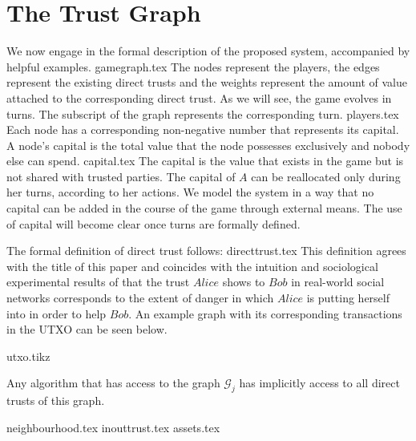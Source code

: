 \section{The Trust Graph}
  We now engage in the formal description of the proposed system, accompanied by helpful examples.
  {gamegraph.tex}
  \noindent The nodes represent the players, the edges represent the existing direct trusts and the weights represent the
  amount of value attached to the corresponding direct trust. As we will see, the game evolves in turns. The subscript of the
  graph represents the corresponding turn.
  {players.tex}
  \noindent Each node has a corresponding non-negative number that represents its capital. A node's capital is the total value
  that the node possesses exclusively and nobody else can spend.
  {capital.tex}
  \noindent The capital is the value that exists in the game but is not shared with trusted parties. The capital of $A$ can be
  reallocated only during her turns, according to her actions. We model the system in a way that no capital can be added in
  the course of the game through external means. The use of capital will become clear once turns are formally defined.

  The formal definition of direct trust follows:
  {directtrust.tex}
  \noindent This definition agrees with the title of this paper and coincides with the intuition and sociological experimental
  results of \cite{kmrs} that the trust $Alice$ shows to $Bob$ in real-world social networks corresponds to the extent of
  danger in which $Alice$ is putting herself into in order to help $Bob$. An example graph with its corresponding transactions
  in the UTXO can be seen below.

  {utxo.tikz}

  \noindent Any algorithm that has access to the graph $\mathcal{G}_j$ has implicitly access to all direct trusts of this
  graph.

  {neighbourhood.tex}
  {inouttrust.tex}
  {assets.tex}
